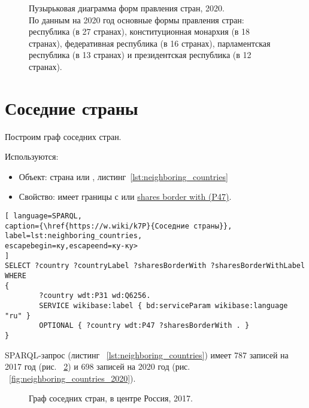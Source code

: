 \begin{figure}
	{
		\setlength{\fboxsep}{0pt}%
		\setlength{\fboxrule}{1pt}%
	}
	\caption{Пузырьковая диаграмма форм правления стран, 2020.
	\\
	По данным на 2020 год  основные формы правления стран: республика (в 27 странах), конституционная монархия (в 18 странах), федеративная республика (в 16 странах), парламентская республика (в 13 странах) и президентская республика (в 12 странах).
}%
	\label{fig:bubble_chart_forms_of_government_countries_2020}%
\end{figure}

\section{Соседние страны}

Построим граф соседних стран.

Используются:
\begin{itemize}
	\item Объект: страна или , листинг~\ref{lst:neighboring_countries}
	\item Свойство: имеет границы с  или \href{https://www.wikidata.org/wiki/Property:P47}{shares border with (P47)}.
\end{itemize}

\begin{lstlisting}[ language=SPARQL, 
caption={\href{https://w.wiki/k7P}{Соседние страны}},
label=lst:neighboring_countries, 
escapebegin=ку,escapeend=ку-ку>
]
SELECT ?country ?countryLabel ?sharesBorderWith ?sharesBorderWithLabel
WHERE
{
		?country wdt:P31 wd:Q6256.	
		SERVICE wikibase:label { bd:serviceParam wikibase:language "ru" }
		OPTIONAL { ?country wdt:P47 ?sharesBorderWith . }
}
\end{lstlisting}

SPARQL-запрос (листинг ~\ref{lst:neighboring_countries}) имеет 787 записей на 2017 год (рис. ~\ref{fig:neighboring_countries_2017}) и 698 записей на 2020 год (рис. ~\ref{fig:neighboring_countries_2020}).

\begin{figure}
	{
		\setlength{\fboxsep}{0pt}%
		\setlength{\fboxrule}{1pt}%
	}
	\caption{Граф соседних стран, в центре Россия, 2017.
	}%
	\label{fig:neighboring_countries_2017}%
\end{figure}

